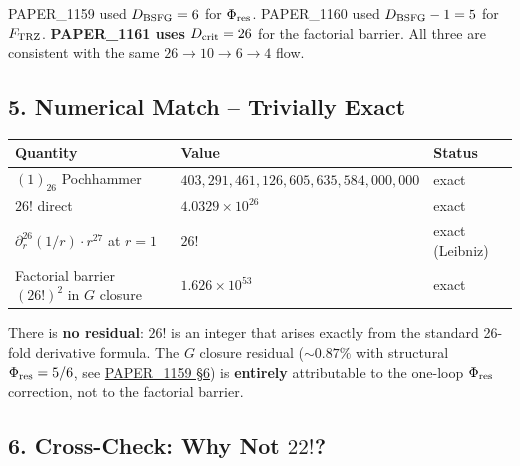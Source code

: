 \documentclass[
]{article}
\newcounter{none} %
\begin{document}
PAPER\_1159 used \(D_{\rm BSFG}=6\) for \(\Phi_{\rm res}\). PAPER\_1160
used \(D_{\rm BSFG}-1=5\) for \(F_{\rm TRZ}\). \textbf{PAPER\_1161 uses
\(D_{\rm crit}=26\)} for the factorial barrier. All three are consistent
with the same \(26 \to 10 \to 6 \to 4\) flow.

\subsection{5. Numerical Match -- Trivially
Exact}\label{numerical-match-trivially-exact}

{\def\LTcaptype{none} %
\begin{longtable}[]{@{}
  >{\raggedright\arraybackslash}p{}
  >{\raggedleft\arraybackslash}p{}
  >{\raggedright\arraybackslash}p{}@{}}
\toprule\noalign{}
\begin{minipage}[b]{\linewidth}\raggedright
Quantity
\end{minipage} & \begin{minipage}[b]{\linewidth}\raggedleft
Value
\end{minipage} & \begin{minipage}[b]{\linewidth}\raggedright
Status
\end{minipage} \\
\midrule\noalign{}
\endhead
\bottomrule\noalign{}
\endlastfoot
\((1)_{26}\) Pochhammer &
\(403{,}291{,}461{,}126{,}605{,}635{,}584{,}000{,}000\) & exact \\
\(26!\) direct & \(4.0329 \times 10^{26}\) & exact \\
\(\partial_r^{26}(1/r)\cdot r^{27}\) at \(r=1\) & \(26!\) & exact
(Leibniz) \\
Factorial barrier \((26!)^2\) in \(G\) closure &
\(1.626 \times 10^{53}\) & exact \\
\end{longtable}
}

There is \textbf{no residual}: \(26!\) is an integer that arises exactly
from the standard 26-fold derivative formula. The \(G\) closure residual
(\(\sim 0.87\%\) with structural \(\Phi_{\rm res}=5/6\), see
\href{whitepapers/PAPER_1159_UQFF_Phi_Res_Codimension_Closure.md}{PAPER\_1159
§6}) is \textbf{entirely} attributable to the one-loop
\(\Phi_{\rm res}\) correction, not to the factorial barrier.

\subsection{\texorpdfstring{6. Cross-Check: Why Not
\(22!\)?}{6. Cross-Check: Why Not 22!?}}\label{cross-check-why-not-22}
\end{document}
